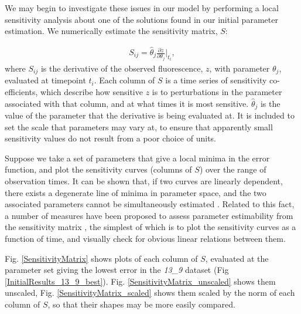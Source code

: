\documentclass[10pt,journal]{./IEEE_latex_class/IEEEtran}
\begin{document}
 We may begin to investigate these issues in our model by performing a local sensitivity analysis about one of the solutions found in our initial parameter estimation. We numerically estimate the sensitivity matrix, $S$:
 
 \begin{align}
S_{ij} = \hat{\theta}_{j} \frac{\partial z}{ \partial \theta_{j}}\Bigr|_{t_{i}},
\end{align}
where $S_{ij}$ is the derivative of the observed fluorescence, $z$, with parameter $\theta_{j}$, evaluated at timepoint $t_{i}$. Each column of $S$ is a time series of sensitivity co-efficients, which describe how sensitive $z$ is to perturbations in the parameter associated with that column, and at what times it is most sensitive. $\hat{\theta}_{j}$ is the value of the parameter that the derivative is being evaluated at. It is included to set the scale that parameters may vary at, to ensure that apparently small sensitivity values do not result from a poor choice of units.

Suppose we take a set of parameters that give a local minima in the error function, and plot the sensitivity curves (columns of $S$)  over the range of observation times. It can be shown that, if two curves are linearly dependent, there exists a degenerate line of minima in parameter space, and the two associated parameters cannot be simultaneously estimated \cite{Beck}. Related to this fact, a number of measures have been proposed to assess parameter estimability from the sensitivity matrix \cite{Mclean2012}, the simplest of which is to plot the sensitivity curves as a function of time, and visually check for obvious linear relations between them.

Fig. \ref{SensitivityMatrix} shows plots of each column of $S$, evaluated at the parameter set giving the lowest error in the \textit{13\_9} dataset (Fig \ref{InitialResults_13_9_best}). Fig. \ref{SensitivityMatrix_unscaled} shows them unscaled, Fig. \ref{SensitivityMatrix_scaled} shows them scaled by the norm of each column of $S$, so that their shapes may be more easily compared.
\end{document}
